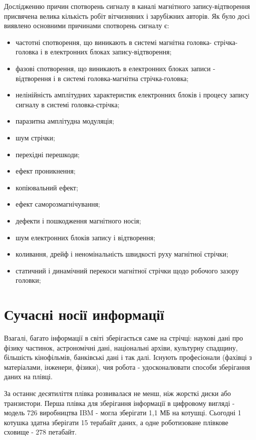 \documentclass[a4paper,14pt]{extreport}
\begin{document}
  Дослідженню причин спотворень сигналу в каналі магнітного запису-відтворення присвячена велика кількість робіт вітчизняних і
  зарубіжних авторів.
  Як було досі виявлено основними причинами спотворень сигналу є:
  \begin{itemize}
  \item частотні спотворення, що виникають в системі магнітна головка-
  стрічка-головка і в електронних блоках запису-відтворення;
  \item фазові спотворення, що виникають в електронних блоках записи -
  відтворення і в системі головка-магнітна стрічка-головка;
  \item нелінійність амплітудних характеристик електронних блоків і
  процесу запису сигналу в системі головка-стрічка;
  \item  паразитна амплітудна модуляція;
  \item шум стрічки;
  \item перехідні перешкоди;
  \item  ефект проникнення;
  \item копіювальний ефект;
  \item ефект саморозмагнічування;
  \item дефекти і пошкодження магнітного носія;
  \item шум електронних блоків запису і відтворення;
  \item коливання, дрейф і неномінальність швидкості руху магнітної стрічки;
  \item статичний і динамічний перекоси магнітної стрічки щодо робочого зазору головки;
  \end{itemize}



\chapter{Сучасні носії информації}
Взагалі, багато інформації в світі зберігається саме на стрічці: наукові дані про фізику частинок, астрономічні дані, національні архіви, культурну спадщину, більшість кінофільмів, банківські дані і так далі. Існують професіонали (фахівці з матеріалами, інженери, фізики), чия робота - удосконалювати способи зберігання даних на плівці.\par

За останнє десятиліття плівка розвивалася не менш, ніж жорсткі диски або транзистори. Перша плівка для зберігання інформації в цифровому вигляді - модель 726 виробництва IBM - могла зберігати 1,1 МБ на котушці. Сьогодні 1 котушка здатна зберігати 15 терабайт даних, а одне роботизоване плівкове сховище - 278 петабайт.\par
\end{document}
